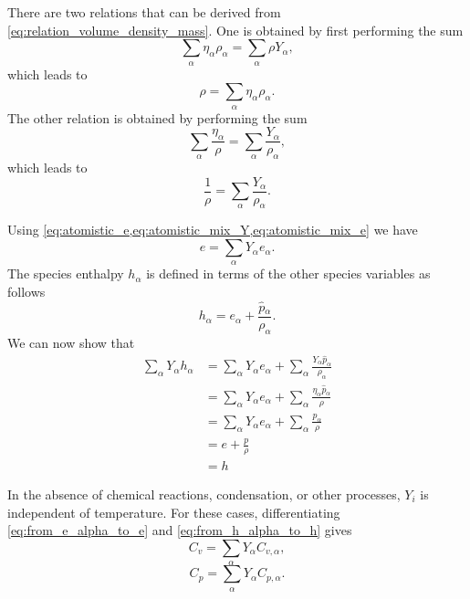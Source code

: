 \documentclass[oneside,a4paper,11pt]{report}
\begin{document}
There are two relations that can be derived from \cref{eq:relation_volume_density_mass}. One is obtained by first performing the sum
\begin{equation}
    \sum_\alpha \eta_\alpha \rho_\alpha = \sum_\alpha \rho Y_\alpha,
\end{equation}
which leads to
\begin{equation}
    \rho = \sum_\alpha \eta_\alpha \rho_\alpha.
\end{equation}
The other relation is obtained by performing the sum
\begin{equation}
    \sum_\alpha \frac{\eta_\alpha}{\rho} = \sum_\alpha \frac{Y_\alpha}{\rho_\alpha},
\end{equation}
which leads to
\begin{equation}
    \label{eq:from_rho_alpha_to_rho_Y}
    \frac{1}{\rho} = \sum_\alpha \frac{Y_\alpha}{\rho_\alpha}.
\end{equation}

Using \cref{eq:atomistic_e,eq:atomistic_mix_Y,eq:atomistic_mix_e} we have
\begin{equation}
    \label{eq:from_e_alpha_to_e}
    e = \sum_\alpha Y_\alpha e_\alpha.
\end{equation}
The species enthalpy $h_\alpha$ is defined in terms of the other species variables as follows
\begin{equation}
\label{eq:species_enthalpy}
    h_\alpha = e_\alpha + \frac{\hat{p}{_\alpha}}{\rho_\alpha}.
\end{equation}
We can now show that
\begin{align}
\label{eq:from_h_alpha_to_h}
     \sum_\alpha Y_\alpha h_\alpha  &= \sum_\alpha Y_\alpha e_\alpha + \sum_\alpha \frac{Y_\alpha \hat{p}_\alpha}{\rho_\alpha} \nonumber \\
     &= \sum_\alpha Y_\alpha e_\alpha + \sum_\alpha \frac{\eta_\alpha \hat{p}_\alpha}{\rho} \nonumber \\
     &= \sum_\alpha Y_\alpha e_\alpha + \sum_\alpha \frac{p_\alpha}{\rho} \nonumber \\
     &= e + \frac{p}{\rho} \nonumber \\
     &= h
\end{align}

In the absence of chemical reactions, condensation, or other processes, $Y_i$ is independent of temperature. For these cases, differentiating \cref{eq:from_e_alpha_to_e} and \cref{eq:from_h_alpha_to_h} gives
\begin{equation}
    C_v = \sum_\alpha Y_\alpha C_{v,\alpha},
\end{equation}
\begin{equation}
    C_p = \sum_\alpha Y_\alpha C_{p,\alpha}.
\end{equation}
\end{document}

